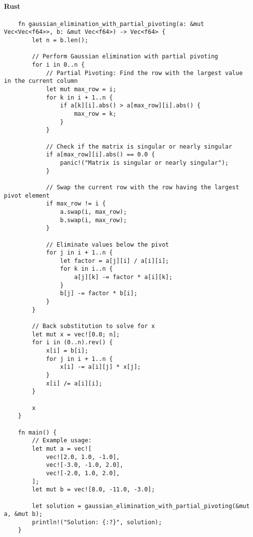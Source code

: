 \documentclass{article}
\begin{document}
            \paragraph{Rust}
                \begin{verbatim}
    fn gaussian_elimination_with_partial_pivoting(a: &mut Vec<Vec<f64>>, b: &mut Vec<f64>) -> Vec<f64> {
        let n = b.len();

        // Perform Gaussian elimination with partial pivoting
        for i in 0..n {
            // Partial Pivoting: Find the row with the largest value in the current column
            let mut max_row = i;
            for k in i + 1..n {
                if a[k][i].abs() > a[max_row][i].abs() {
                    max_row = k;
                }
            }

            // Check if the matrix is singular or nearly singular
            if a[max_row][i].abs() == 0.0 {
                panic!("Matrix is singular or nearly singular");
            }

            // Swap the current row with the row having the largest pivot element
            if max_row != i {
                a.swap(i, max_row);
                b.swap(i, max_row);
            }

            // Eliminate values below the pivot
            for j in i + 1..n {
                let factor = a[j][i] / a[i][i];
                for k in i..n {
                    a[j][k] -= factor * a[i][k];
                }
                b[j] -= factor * b[i];
            }
        }

        // Back substitution to solve for x
        let mut x = vec![0.0; n];
        for i in (0..n).rev() {
            x[i] = b[i];
            for j in i + 1..n {
                x[i] -= a[i][j] * x[j];
            }
            x[i] /= a[i][i];
        }

        x
    }

    fn main() {
        // Example usage:
        let mut a = vec![
            vec![2.0, 1.0, -1.0],
            vec![-3.0, -1.0, 2.0],
            vec![-2.0, 1.0, 2.0],
        ];
        let mut b = vec![8.0, -11.0, -3.0];

        let solution = gaussian_elimination_with_partial_pivoting(&mut a, &mut b);
        println!("Solution: {:?}", solution);
    }
                \end{verbatim}
\end{document}
